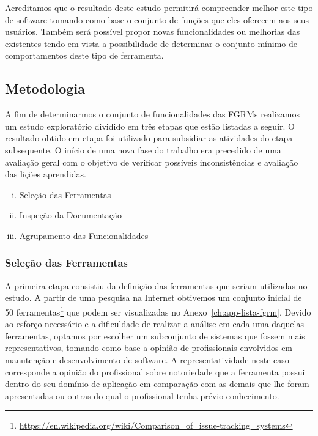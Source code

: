 Acreditamos que o resultado deste estudo permitirá compreender melhor este tipo
de software tomando como base o conjunto de funções que eles oferecem aos seus
usuários. Também será possível propor novas funcionalidades ou melhorias das
existentes tendo em vista a possibilidade de determinar o conjunto mínimo de
comportamentos deste tipo de ferramenta.

\subsection{Metodologia}
\label{subsec:metodologia}

A fim de determinarmos o conjunto de funcionalidades das FGRMs realizamos um
estudo exploratório dividido em três etapas que estão listadas a seguir. O
resultado obtido em etapa foi utilizado para subsidiar as atividades do etapa
subsequente. O início de uma nova fase do trabalho era precedido de uma
avaliação geral com o objetivo de verificar possíveis inconsistências e
avaliação das lições aprendidas.

\begin{enumerate}[(i)]
	\item Seleção das Ferramentas
	\item Inspeção da Documentação
	\item Agrupamento das Funcionalidades
\end{enumerate}

\subsubsection{Seleção das Ferramentas}
\label{subsubsec:selecao-ferramentas}

A primeira etapa consistiu da definição das ferramentas que seriam utilizadas no
estudo. A partir de uma pesquisa na Internet obtivemos um conjunto inicial de 50
ferramentas\footnote{\url{https://en.wikipedia.org/wiki/Comparison_of_issue-tracking_systems}}
que podem ser visualizadas no Anexo~\ref{ch:app-lista-fgrm}. Devido ao esforço
necessário e a dificuldade de realizar a análise em cada uma daquelas
ferramentas, optamos por escolher um subconjunto de sistemas que fossem mais
representativos, tomando como base a opinião de profissionais envolvidos em
manutenção e desenvolvimento de software. A representatividade neste caso
corresponde a opinião do profissional sobre notoriedade que a ferramenta possui
dentro do seu domínio de aplicação em comparação com as demais que lhe foram
apresentadas ou outras do qual o profissional tenha prévio conhecimento.


